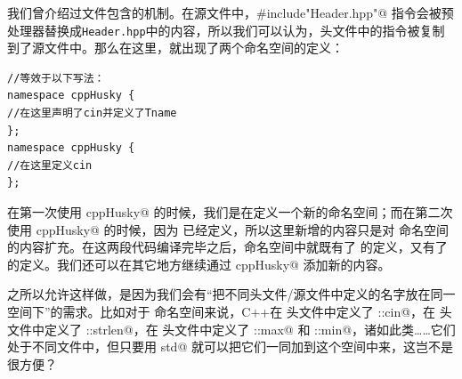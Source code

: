 我们曾介绍过文件包含的机制。在源文件中，\lstinline@#include"Header.hpp"@ 指令会被预处理器替换成\texttt{Header.hpp}中的内容，所以我们可以认为，头文件中的指令被复制到了源文件中。那么在这里，就出现了两个命名空间的定义：
\begin{lstlisting}
//等效于以下写法：
namespace cppHusky {
//在这里声明了cin并定义了Tname
};
namespace cppHusky {
//在这里定义cin
};
\end{lstlisting}
在第一次使用 \lstinline@namespace cppHusky@ 的时候，我们是在定义一个新的命名空间；而在第二次使用 \lstinline@namespace cppHusky@ 的时候，因为 \lstinline@cppHusky@ 已经定义，所以这里新增的内容只是对 \lstinline@cppHusky@ 命名空间的内容扩充。在这两段代码编译完毕之后，\lstinline@cppHusky@ 命名空间中就既有了 \lstinline@Tname@ 的定义，又有了 \lstinline@cin@ 的定义。我们还可以在其它地方继续通过 \lstinline@namespace cppHusky@ 添加新的内容。\par
之所以允许这样做，是因为我们会有``把不同头文件/源文件中定义的名字放在同一空间下''的需求。比如对于 \lstinline@std@ 命名空间来说，C++在 \lstinline@iostream@ 头文件中定义了 \lstinline@std::cin@，在 \lstinline@cstring@ 头文件中定义了 \lstinline@std::strlen@，在 \lstinline@algorithm@ 头文件中定义了 \lstinline@std::max@ 和 \lstinline@std::min@，诸如此类……它们处于不同文件中，但只要用 \lstinline@namespace std@ 就可以把它们一同加到这个空间中来，这岂不是很方便？\par

